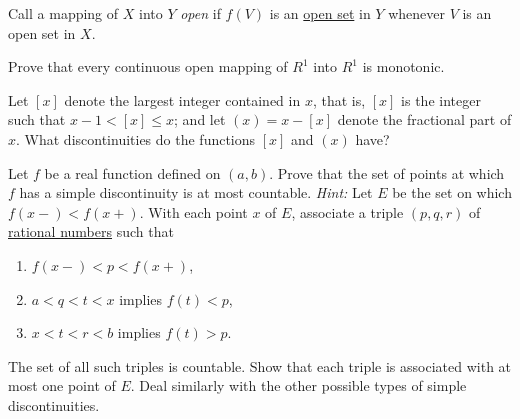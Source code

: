   \begin{exercise}[Rudin 4.15]
    Call a mapping of $X$ into $Y$ \textit{open} if $f(V)$ is an \hyperref[pst-def:open-set]{open set} in $Y$ whenever $V$ is an open set in $X$.
    \par Prove that every continuous open mapping of $R^1$ into $R^1$ is monotonic.
  \end{exercise}
  \begin{solution}

  \end{solution}

  \begin{exercise}[Rudin 4.16]
    Let $[x]$ denote the largest integer contained in $x$, that is, $[x]$ is the integer such that $x - 1 < [x] \le x$; and let $(x) = x - [x]$ denote the fractional part of $x$. What discontinuities do the functions $[x]$ and $(x)$ have?
  \end{exercise}
  \begin{solution}

  \end{solution}

  \begin{exercise}[Rudin 4.17]
    Let $f$ be a real function defined on $(a, b)$. Prove that the set of points at which $f$ has a simple discontinuity is at most countable. \textit{Hint:} Let $E$ be the set on which $f(x-) < f(x+)$. With each point $x$ of $E$, associate a triple $(p, q, r)$ of \hyperref[alg-def:rational-numbers]{rational numbers} such that
    \begin{enumerate}
      \item[(a)] $f(x-) < p < f(x+)$,
      \item[(b)] $a < q < t < x$ implies $f(t) < p$,
      \item[(c)] $x < t < r < b$ implies $f(t) > p$.
    \end{enumerate}
    The set of all such triples is countable. Show that each triple is associated with at most one point of $E$. Deal similarly with the other possible types of simple discontinuities.
  \end{exercise}
  \begin{solution}

  \end{solution}

